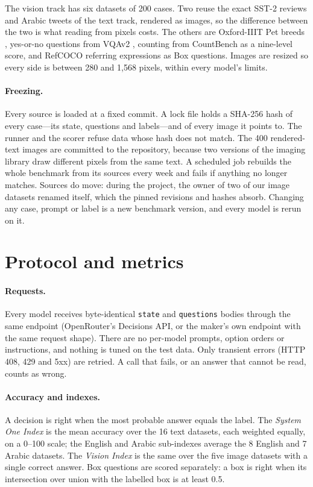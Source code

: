 \documentclass[11pt]{article}
\begin{document}
The vision track has six datasets of 200 cases. Two reuse the exact SST-2 reviews and Arabic tweets of the text
track, rendered as images, so the difference between the two is what reading from pixels costs. The others are
Oxford-IIIT Pet breeds \citep{parkhi2012cats}, yes-or-no questions from VQAv2 \citep{goyal2017making}, counting from
CountBench \citep{paiss2023teaching} as a nine-level score, and RefCOCO referring expressions \citep{yu2016modeling}
as Box questions. Images are resized so every side is between 280 and 1{,}568 pixels, within every model's limits.

\paragraph{Freezing.} Every source is loaded at a fixed commit. A lock file holds a SHA-256 hash of every case---its
state, questions and labels---and of every image it points to. The runner and the scorer refuse data whose hash does
not match. The 400 rendered-text images are committed to the repository, because two versions of the imaging library
draw different pixels from the same text. A scheduled job rebuilds the whole benchmark from its sources every week
and fails if anything no longer matches. Sources do move: during the project, the owner of two of our image datasets
renamed itself, which the pinned revisions and hashes absorb. Changing any
case, prompt or label is a new benchmark version, and every model is rerun on it.



\section{Protocol and metrics}\label{sec:protocol}

\paragraph{Requests.} Every model receives byte-identical \texttt{state} and \texttt{questions} bodies through the
same endpoint (OpenRouter's Decisions API, or the maker's own endpoint with the same request shape). There are no
per-model prompts, option orders or instructions, and nothing is tuned on the test data. Only transient errors (HTTP
408, 429 and 5xx) are retried. A call that fails, or an answer that cannot be read, counts as wrong.

\paragraph{Accuracy and indexes.} A decision is right when the most probable answer equals the label. The
\emph{System One Index} is the mean accuracy over the 16 text datasets, each weighted equally, on a 0--100 scale; the
English and Arabic sub-indexes average the 8 English and 7 Arabic datasets. The \emph{Vision Index} is the same over
the five image datasets with a single correct answer. Box questions are scored separately: a box is right when its
intersection over union with the labelled box is at least 0.5.
\end{document}
